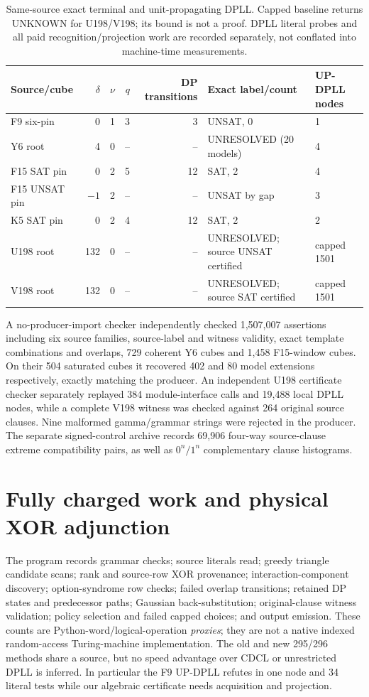 \documentclass[11pt]{article}
\begin{document}
\begin{table}[ht]
\centering\small
\begin{tabular}{lrrrrll}
\toprule
Source/cube & $\delta$ & $\nu$ & $q$ & DP transitions & Exact label/count & UP-DPLL nodes \\
\midrule
F9 six-pin & 0 & 1 & 3 & 3 & UNSAT, 0 & 1 \\
Y6 root & 4 & 0 & -- & -- & UNRESOLVED (20 models) & 4 \\
F15 SAT pin & 0 & 2 & 5 & 12 & SAT, 2 & 4 \\
F15 UNSAT pin & $-1$ & 2 & -- & -- & UNSAT by gap & 3 \\
K5 SAT pin & 0 & 2 & 4 & 12 & SAT, 2 & 2 \\
U198 root & 132 & 0 & -- & -- & UNRESOLVED; source UNSAT certified & capped 1501 \\
V198 root & 132 & 0 & -- & -- & UNRESOLVED; source SAT certified & capped 1501 \\
\bottomrule
\end{tabular}
\caption{Same-source exact terminal and unit-propagating DPLL. Capped baseline returns UNKNOWN for U198/V198; its bound is not a proof. DPLL literal probes and all paid recognition/projection work are recorded separately, not conflated into machine-time measurements.}
\end{table}

A no-producer-import checker independently checked 1,507,007 assertions including six source families, source-label and witness validity, exact template combinations and overlaps, 729 coherent Y6 cubes and 1,458 F15-window cubes. On their 504 saturated cubes it recovered 402 and 80 model extensions respectively, exactly matching the producer. An independent U198 certificate checker separately replayed 384 module-interface calls and 19,488 local DPLL nodes, while a complete V198 witness was checked against 264 original source clauses. Nine malformed gamma/grammar strings were rejected in the producer. The separate signed-control archive records 69,906 four-way source-clause extreme compatibility pairs, as well as $0^n/1^n$ complementary clause histograms.

\section{Fully charged work and physical XOR adjunction}
The program records grammar checks; source literals read; greedy triangle candidate scans; rank and source-row XOR provenance; interaction-component discovery; option-syndrome row checks; failed overlap transitions; retained DP states and predecessor paths; Gaussian back-substitution; original-clause witness validation; policy selection and failed capped choices; and output emission. These counts are Python-word/logical-operation \emph{proxies}; they are not a native indexed random-access Turing-machine implementation. The old and new 295/296 methods share a source, but no speed advantage over CDCL or unrestricted DPLL is inferred. In particular the F9 UP-DPLL refutes in one node and 34 literal tests while our algebraic certificate needs acquisition and projection.
\end{document}
